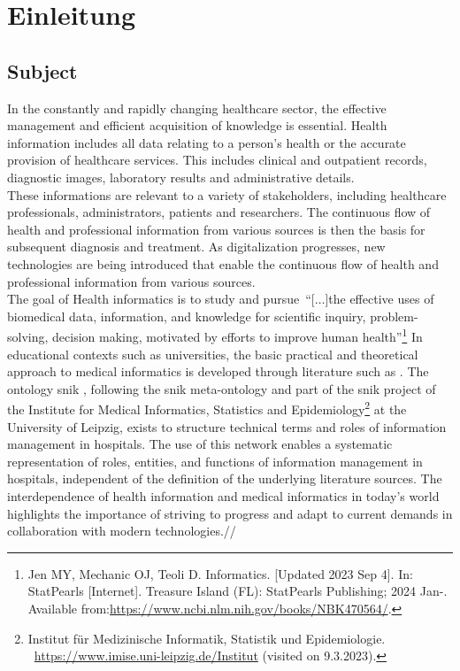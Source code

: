 \chapter{Einleitung}\label{ch:introduction}
\section{Subject}
In the constantly and rapidly changing healthcare sector, the effective management and efficient acquisition of knowledge is essential. 
Health information includes all data relating to a person's health or the accurate provision of healthcare services. This includes clinical and outpatient records, diagnostic images, laboratory results and administrative details.\\

These informations are relevant to a variety of stakeholders, including healthcare professionals, administrators, patients and researchers. 
The continuous flow of health and professional information from various sources is then the basis for subsequent diagnosis and treatment. 
As digitalization progresses, new technologies are being introduced that enable the continuous flow of health and professional information from various sources.\\
 
The goal of Health informatics is to study and pursue~\enquote{[$\dots$]the effective uses of biomedical data, information, and knowledge for scientific inquiry, problem-solving, decision making, motivated by efforts to improve human health}\footnote{\raggedright{}Jen MY, Mechanic OJ, Teoli D. Informatics. [Updated 2023 Sep 4]. In: StatPearls [Internet]. 
Treasure Island (FL): StatPearls Publishing; 2024 Jan-. Available from:\url{https://www.ncbi.nlm.nih.gov/books/NBK470564/}.} 
In educational contexts such as universities, the basic practical and theoretical approach to medical informatics is developed through literature such as \citet{bb}. 
The ontology \ac{snik} \citep{semantischesnetz}, following the \ac{snik} meta-ontology and part of the \ac{snik} project of the Institute for Medical Informatics, Statistics and Epidemiology\footnote{\raggedright{}Institut für Medizinische Informatik, Statistik und Epidemiologie.
\ \url{https://www.imise.uni-leipzig.de/Institut} (visited on 9.3.2023).} at the University of Leipzig, exists to structure technical terms and roles of information management in hospitals. 
The use of this network enables a systematic representation of roles, entities, and functions of information management in hospitals, independent of the definition of the underlying literature sources. 
The interdependence of health information and medical informatics in today's world highlights the importance of striving to progress and adapt to current demands in collaboration with modern technologies.//


